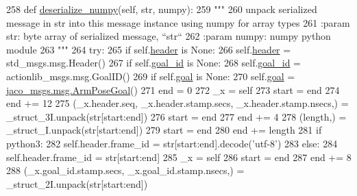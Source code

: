 \begin{DoxyCode}
258   \textcolor{keyword}{def }\hyperlink{classjaco__msgs_1_1msg_1_1__ArmPoseActionGoal_1_1ArmPoseActionGoal_acfb9b552e31367c062e2b303ef388f39}{deserialize\_numpy}(self, str, numpy):
259     \textcolor{stringliteral}{"""}
260 \textcolor{stringliteral}{    unpack serialized message in str into this message instance using numpy for array types}
261 \textcolor{stringliteral}{    :param str: byte array of serialized message, ``str``}
262 \textcolor{stringliteral}{    :param numpy: numpy python module}
263 \textcolor{stringliteral}{    """}
264     \textcolor{keywordflow}{try}:
265       \textcolor{keywordflow}{if} self.\hyperlink{classjaco__msgs_1_1msg_1_1__ArmPoseActionGoal_1_1ArmPoseActionGoal_a5306d39d1f1d9fac907a1be35d8f3a61}{header} \textcolor{keywordflow}{is} \textcolor{keywordtype}{None}:
266         self.\hyperlink{classjaco__msgs_1_1msg_1_1__ArmPoseActionGoal_1_1ArmPoseActionGoal_a5306d39d1f1d9fac907a1be35d8f3a61}{header} = std\_msgs.msg.Header()
267       \textcolor{keywordflow}{if} self.\hyperlink{classjaco__msgs_1_1msg_1_1__ArmPoseActionGoal_1_1ArmPoseActionGoal_ae3ea72079050262cb7aa3631b06a3d90}{goal\_id} \textcolor{keywordflow}{is} \textcolor{keywordtype}{None}:
268         self.\hyperlink{classjaco__msgs_1_1msg_1_1__ArmPoseActionGoal_1_1ArmPoseActionGoal_ae3ea72079050262cb7aa3631b06a3d90}{goal\_id} = actionlib\_msgs.msg.GoalID()
269       \textcolor{keywordflow}{if} self.\hyperlink{classjaco__msgs_1_1msg_1_1__ArmPoseActionGoal_1_1ArmPoseActionGoal_aa44704a711912d8f0b1abb1352d1b71d}{goal} \textcolor{keywordflow}{is} \textcolor{keywordtype}{None}:
270         self.\hyperlink{classjaco__msgs_1_1msg_1_1__ArmPoseActionGoal_1_1ArmPoseActionGoal_aa44704a711912d8f0b1abb1352d1b71d}{goal} = \hyperlink{classjaco__msgs_1_1msg_1_1__ArmPoseGoal_1_1ArmPoseGoal}{jaco\_msgs.msg.ArmPoseGoal}()
271       end = 0
272       \_x = self
273       start = end
274       end += 12
275       (\_x.header.seq, \_x.header.stamp.secs, \_x.header.stamp.nsecs,) = \_struct\_3I.unpack(str[start:end])
276       start = end
277       end += 4
278       (length,) = \_struct\_I.unpack(str[start:end])
279       start = end
280       end += length
281       \textcolor{keywordflow}{if} python3:
282         self.header.frame\_id = str[start:end].decode(\textcolor{stringliteral}{'utf-8'})
283       \textcolor{keywordflow}{else}:
284         self.header.frame\_id = str[start:end]
285       \_x = self
286       start = end
287       end += 8
288       (\_x.goal\_id.stamp.secs, \_x.goal\_id.stamp.nsecs,) = \_struct\_2I.unpack(str[start:end])

\end{DoxyCode}
